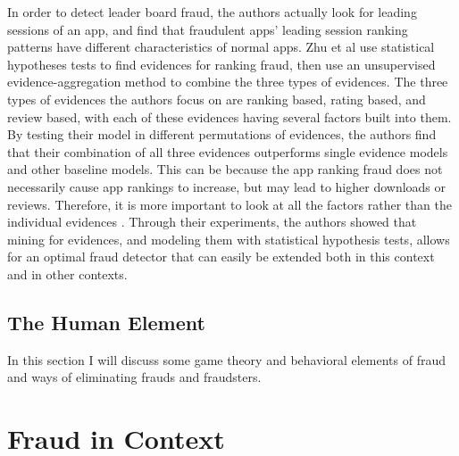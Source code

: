\documentclass[midd]{thesis}
\begin{document}
In order to detect leader board fraud, the authors actually look for leading sessions of an app, and find that fraudulent apps' leading session ranking patterns have different characteristics of normal apps. Zhu et al use statistical hypotheses tests to find evidences for ranking fraud, then use an unsupervised evidence-aggregation method to combine the three types of evidences. The three types of evidences the authors focus on are ranking based, rating based, and review based, with each of these evidences having several factors built into them. By testing their model in different permutations of evidences, the authors find that their combination of all three evidences outperforms single evidence models and other baseline models. This can be because the app ranking fraud does not necessarily cause app rankings to increase, but may lead to higher downloads or reviews. Therefore, it is more important to look at all the factors rather than the individual evidences \cite{Zhu2015}. Through their experiments, the authors showed that mining for evidences, and modeling them with statistical hypothesis tests, allows for an optimal fraud detector that can easily be extended both in this context and in other contexts. 


\section{The Human Element}

In this section I will discuss some game theory and behavioral elements of fraud and ways of eliminating frauds and fraudsters.



\noindent
%
%

\pagebreak
\chapter{ Fraud in Context}
\label{sec:context}
\end{document}
